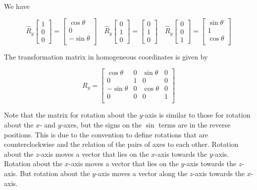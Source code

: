 \documentclass[12pt]{article}
\newcommand{\nin}{\noindent}
\newcommand{\vthree}{\vspace{3mm}}
\newcommand{\mymat}[1]{
\left[
\begin{array}{rrrrrrrrrrrrrrrrrrrrrrrrrrrrrrrrrrrrrrr}
#1
\end{array}
\right]
}
\begin{document}
\vthree

\nin We have

\[
\hat{R}_y\mymat{
1 \\
0 \\
0
}
=
\mymat{
\cos\theta \\
0 \\
-\sin\theta \\
}
\quad
\hat{R}_y\mymat{
0 \\
1 \\
0
}
=
\mymat{
0 \\
1 \\
0
}
\quad
\hat{R}_y\mymat{
0 \\
0 \\
1
}
=
\mymat{
\sin\theta \\
1 \\
\cos\theta \\
}
\]

\vthree

\nin The transformation matrix in homogeneous coordinates is given by

\[
R_y =
\mymat{
 \cos\theta & 0 & \sin\theta  & 0 \\
0 & 1 & 0 & 0 \\
-\sin\theta & 0 & \cos\theta  & 0 \\
0 & 0 & 0 & 1 \\
}
\]

\vthree

\nin Note that the matrix for rotation about the $y$-axis is similar to those for rotation about the $x$- and $y$-axes, but the signs on the $\sin$ terms are in the reverse positions.  This is due to the convention to define rotations that are counterclockwise and the relation of the pairs of axes to each other.  Rotation about the $z$-axis moves a vector that lies on the $x$-axis towards the $y$-axis.  Rotation about the $x$-axis moves a vector that lies on the $y$-axis towards the $z$-axis.  But rotation about the $y$-axis moves a vector along the $z$-axis towards the $x$-axis.
\end{document}
